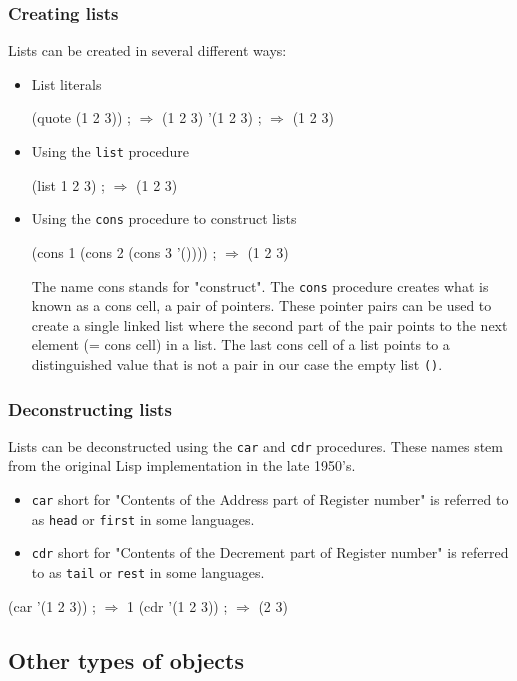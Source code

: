 \documentclass[12pt,a4paper,english,twoside]{article}
\begin{document}
\subsubsection{Creating lists}
Lists can be created in several different ways:
\begin{itemize}
\item List literals 
\begin{schemecode}
(quote (1 2 3)) ; $\Rightarrow$ (1 2 3)
'(1 2 3) ; $\Rightarrow$ (1 2 3)
\end{schemecode}
\item Using the \texttt{list} procedure
\begin{schemecode}
(list 1 2 3) ; $\Rightarrow$ (1 2 3)
\end{schemecode}
\item Using the \texttt{cons} procedure to construct lists  
\begin{schemecode}
(cons 1 (cons 2 (cons 3 '()))) ; $\Rightarrow$ (1 2 3)
\end{schemecode}
The name cons stands for "construct". The \texttt{cons} procedure creates what is known as a cons cell, a pair of pointers. These pointer pairs can be used to create a single linked list where the second part of the pair points to the next element (= cons cell) in a list. The last cons cell of a list points to a distinguished value that is not a pair in our case the empty list \texttt{()}. 
\end{itemize}
\subsubsection{Deconstructing lists}
Lists can be deconstructed using the \texttt{car} and \texttt{cdr} procedures. These names stem from the original Lisp implementation in the late 1950's. 
\begin{itemize}
\item \texttt{car} short for "Contents of the Address part of Register number" is referred to as \texttt{head} or \texttt{first} in some languages.
\item \texttt{cdr} short for "Contents of the Decrement part of Register number" is referred to as \texttt{tail} or \texttt{rest} in some languages.
\end{itemize} 
\begin{schemecode}
(car '(1 2 3)) ; $\Rightarrow$ 1
(cdr '(1 2 3)) ; $\Rightarrow$ (2 3)
\end{schemecode}
\subsection{Other types of objects}
\end{document}
